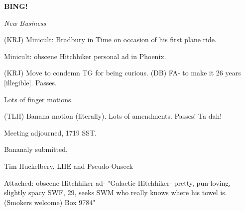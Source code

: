 \documentclass[12pt]{article}
\newcommand{\bing}{{\bf BING!} }
\newcommand{\goto}[1]{\bing \vskip 12pt \centerline{{\em{#1}}}}
\begin{document}
\goto{New Business}

(KRJ) Minicult: Bradbury in Time on occasion of his first plane ride.

Minicult: obscene Hitchhiker personal ad in Phoenix.

(KRJ) Move to condemn TG for being curious. (DB) FA- to make it 26 years [illegible]. Passes.

Lots of finger motions.

(TLH) Banana motion (literally). Lots of amendments. Passes! Ta dah!

\vspace{12pt}

\noindent
Meeting adjourned, 1719 SST.

\vspace{18pt}

\centerline{Bananaly submitted,}
\centerline{Tim Huckelbery, LHE and Pseudo-Onseck}

Attached: obscene Hitchhiker ad- "Galactic Hitchhiker- pretty, pun-loving, slightly spacy SWF, 29, seeks SWM who really knows where his towel is. (Smokers welcome) Box 9784"
\end{document}
